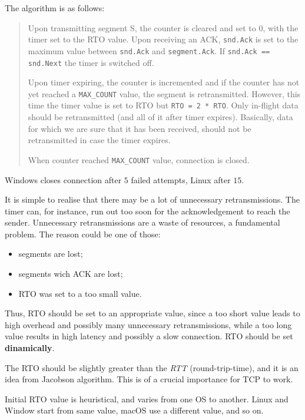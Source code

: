 \documentclass[a4paper, 11pt]{report}
\begin{document}
The algorithm is as follows:

\begin{quote}
Upon transmitting segment S, the counter is cleared and set to $0$, with the
timer set to the RTO value. Upon receiving an ACK, \texttt{snd.Ack} is set to
the maximum value between \texttt{snd.Ack} and \texttt{segment.Ack}. If
\texttt{snd.Ack == snd.Next} the timer is switched off.

Upon timer expiring, the counter is incremented and if the counter has not yet
reached a \texttt{MAX\_COUNT} value, the segment is retransmitted. However, this
time the timer value is set to RTO but \texttt{RTO = 2 * RTO}. Only in-flight data
should be retransmitted (and all of it after timer expires). Basically, data
for which we are sure that it has been received, should not be retransmitted in
case the timer expires.

When counter reached \texttt{MAX\_COUNT} value, connection is closed.
\end{quote}

Windows closes connection after $5$ failed attempts, Linux after $15$.

It is simple to realise that there may be a lot of unnecessary retransmissions.
The timer can, for instance, run out too soon for the acknowledgement to reach
the sender. Unnecessary retransmissions are a waste of resources, a fundamental
problem. The reason could be one of those:

\begin{itemize}
	\item segments are lost;
	\item segments wich ACK are lost;
	\item RTO was set to a too small value.
\end{itemize}

Thus, RTO should be set to an appropriate value, since a too short value leads
to high overhead and possibly many unnecessary retransmissions, while a too
long value results in high latency and possibly a slow connection. RTO should
be set \textbf{dinamically}.

The RTO should be slightly greater than the \emph{RTT} (round-trip-time), and
it is an idea from Jacobson algorithm. This is of a crucial importance for TCP
to work.

Initial RTO value is heuristical, and varies from one OS to another. Linux and
Window start from same value, macOS use a different value, and so on.
\end{document}
